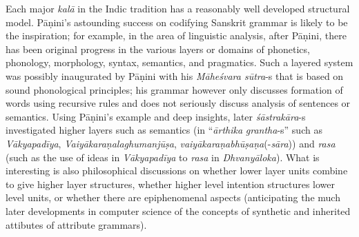Each major \textsl{kalā} in the Indic tradition has a reasonably well developed structural model. Pāṇini’s astounding success on codifying Sanskrit grammar is likely to be the inspiration; for example, in the area of linguistic analysis, after Pāṇini, there has been original progress in the various layers or domains of phonetics, phonology, morphology, syntax, semantics, and pragmatics. Such a layered system was possibly inaugurated by Pāṇini with his \textsl{Māheśvara sūtra}-s that is based on sound phonological principles; his grammar however only discusses formation of words using recursive rules and does not seriously discuss analysis of sentences or semantics. Using Pāṇini’s example and deep insights, later \textsl{śāstrakāra}-s investigated higher layers such as semantics (in “\textsl{ārthika} \textsl{grantha}-s” such as \textsl{Vākyapadīya}, \textsl{Vaiyākaraṇalaghumanjūṣa}, \textsl{vaiyākaraṇabhūṣaṇa}(-\textsl{sāra})) and \textsl{rasa} (such as the use of ideas in \textsl{Vākyapadīya} to \textsl{rasa} in \textsl{Dhvanyāloka}). What is interesting is also philosophical discussions on whether lower layer units combine to give higher layer structures, whether higher level intention structures lower level units, or whether there are epiphenomenal aspects (anticipating the much later developments in computer science of the concepts of synthetic and inherited attibutes of attribute grammars).

\newpage

